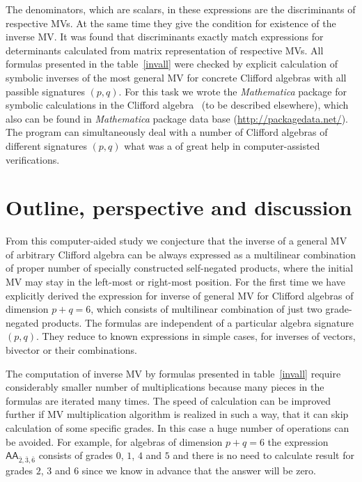 \documentclass{birkjour}
\def\m#1{\mathsf{#1}} %
\begin{document}
The denominators, which are scalars, in these expressions are the
discriminants of respective MVs. At the same time they give the
condition for existence of the inverse MV. It was found that
discriminants exactly match expressions for determinants
calculated from matrix representation of respective  MVs.
All formulas presented in the table~\ref{invall} were checked by
explicit calculation of symbolic inverses of the most general MV
for concrete Clifford algebras with all passible signatures $(p,q)$.
For this task we wrote the {\it Mathematica} package for symbolic
calculations in the Clifford algebra~\cite{AcusDargys2017}  (to be
described elsewhere), which also can be found in {\it Mathematica}
package data base (\url{http://packagedata.net/}). The program can
simultaneously deal with a number of Clifford algebras of
different signatures $(p,q)$ what was a of great help in
computer-assisted verifications.

\section{Outline, perspective and discussion\label{sec:5}}
From this computer-aided study we conjecture that the inverse of a
general MV of arbitrary Clifford algebra can be always  expressed
as a multilinear combination of proper number of specially
constructed self-negated products, where the initial MV may stay
in the left-most or right-most position. For the first time we
have explicitly derived the expression for inverse of general MV
for Clifford algebras of dimension $p+q=6$, which consists of
multilinear combination of just two grade-negated products. The
formulas are independent of a particular algebra signature
$(p,q)$.  They reduce to known expressions in simple cases, for
inverses of vectors, bivector or their combinations. 

The computation of inverse MV by formulas presented in
table~\ref{invall} require considerably smaller number of
multiplications because many pieces in the formulas are iterated
many times. The speed of calculation can be improved further if MV
multiplication algorithm is realized in such a way, that it can skip 
calculation of some specific grades. In this case a
huge number of operations can be avoided. For example, for
algebras of dimension $p+q=6$  the expression $\m{A}\m{A}_{{\bar
2},{\bar 3},{\bar 6}}$ consists of grades $0$, $1$, $4$ and $5$
and there is no need to calculate result for grades $2$, $3$ and $6$ since  we know
in advance that the answer will be zero.
\end{document}
